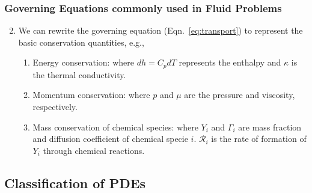\documentclass[10pt,compress,handout,ignorenonframetext]{beamer}
\begin{document}
\begin{frame}
 \frametitle{Governing Equations commonly used in Fluid Problems} 
\begin{enumerate}
  \setcounter{enumi}{1}
  \item <1-> We can rewrite the governing equation (Eqn.~\ref{eq:transport}) to represent the basic conservation quantities, e.g.,
     \begin{enumerate}
        \item <2-> Energy conservation:
            where $dh=C_{p}dT$ represents the enthalpy and $\kappa$ is the thermal conductivity.
         \item <3-> Momentum conservation:
          where $p$ and $\mu$ are the pressure and viscosity, respectively.
         \item <4-> Mass conservation of chemical species:
          where $Y_{i}$ and $\Gamma_{i}$ are mass fraction and diffusion coefficient of chemical specie $i$. $\mathcal{R}_{i}$ is the rate of formation of $Y_{i}$ through chemical reactions. 
      \end{enumerate}
\end{enumerate}   
 
\end{frame}


\subsection{Classification of PDEs}
\end{document}
